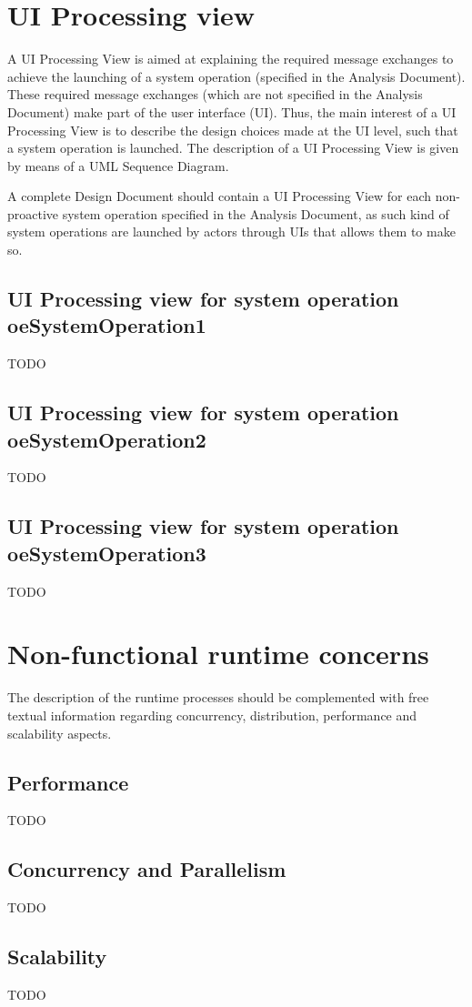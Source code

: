 \section{UI Processing view}
A \gls{UI Processing View} is aimed at explaining the required message exchanges
to achieve the launching of a system operation (specified in the \msrmessir
Analysis Document). These required message exchanges (which are not specified in
the \msrmessir Analysis Document) make part of the user interface (UI). Thus, the
main interest of a UI Processing View is to describe the design choices made
at the UI level, such that a system operation is launched. The description
of a UI Processing View is given by means of a UML Sequence Diagram. 


A complete Design Document should contain a UI Processing View for each
non-proactive system operation specified in the \msrmessir Analysis Document, as
such kind of system operations are launched by actors through UIs that allows
them to make so. 



\subsection{UI Processing view for system operation oeSystemOperation1}
TODO

 
\subsection{UI Processing view for system operation oeSystemOperation2}
TODO


\subsection{UI Processing view for system operation oeSystemOperation3}
TODO





\section{Non-functional runtime concerns}
The description of the runtime processes should be complemented with free
textual information regarding concurrency, distribution, performance and scalability aspects.


\subsection{Performance}
TODO



\subsection{Concurrency and Parallelism}
TODO




\subsection{Scalability}
TODO






